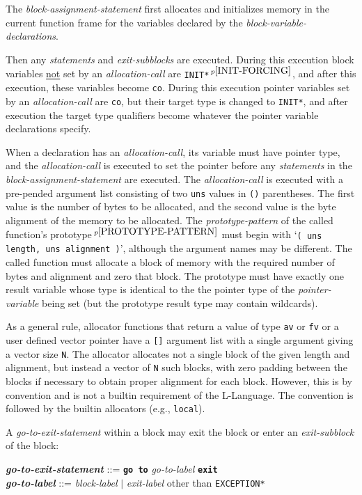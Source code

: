 \documentclass[12pt]{article}
\newcommand{\TT}[1]{{\tt \bfseries #1}}
\newcommand{\ttkey}[1]{{\tt \bfseries #1}}
\newcommand{\emkey}[1]{{\em \bfseries #1}}
\newcommand{\pagnote}[1]{$\,^{p\pageref{#1}}$}
\newenvironment{indpar}[1][0.3in]%
	{\begin{list}{}%
		     {\setlength{\itemsep}{0in}%
		      \setlength{\topsep}{0in}%
		      \setlength{\parsep}{1ex}%
		      \setlength{\labelwidth}{#1}%
		      \setlength{\leftmargin}{#1}%
		      \addtolength{\leftmargin}{\labelsep}}%
	 \item}%
	{\end{list}}
\begin{document}
The {\em block-assignment-statement}
first allocates and initializes memory in the current function frame
for the variables declared by the {\em block-variable-declarations}.

Then any {\em statements} and
{\em exit-subblocks} are executed.  During this execution
block variables \underline{not} set by an {\em allocation-call}
are {\tt *INIT*}\pagnote{INIT-FORCING},
and after this execution, these variables become
{\tt co}.  During this execution pointer variables set by
an {\em allocation-call} are {\tt co}, but their target type is changed
to {\tt *INIT*}, and after execution the target type
qualifiers become whatever the pointer variable declarations specify.

When a declaration has an {\em allocation-call}\label{ALLOCATION-CALLS},
its variable must have pointer
type, and the {\em allocation-call} is executed to set the pointer
before any {\em statements} in the {\em block-assignment-statement}
are executed.  The {\em allocation-call} is executed
with a pre-pended argument list consisting of two {\tt uns} values
in {\tt ()} parentheses.  The first value is the number of bytes to
be allocated, and the second value is the byte alignment of the
memory to be allocated.
The {\em prototype-pattern}
of the called function's prototype\pagnote{PROTOTYPE-PATTERN}
must begin with `{\tt ( uns length, uns alignment )}', although
the argument names may be different.
The called function must allocate a block of
memory with the required number of bytes and alignment and zero that
block.  The prototype must have
exactly one result variable whose type is identical to the
the pointer type of the {\em pointer-variable} being set (but the
prototype result type may contain wildcards).

As a general rule, allocator functions that return a value of
type {\tt av} or {\tt fv} or a user defined vector pointer
have a {\tt []} argument list
with a single argument giving a vector size {\tt N}.
The allocator allocates not a single block of the given length
and alignment, but instead a vector of {\tt N} such blocks, with zero padding
between the blocks if necessary to obtain proper alignment for each
block.  However,
this is by convention and is not a builtin requirement of the L-Language.
The convention is followed by the builtin allocators (e.g., {\tt local}).

A {\em go-to-exit-statement} within a block may exit the block or
enter an {\em exit-subblock} of the block:
\begin{indpar}
\emkey{go-to-exit-statement}\label{GO-TO-STATEMENT} ::=
    \ttkey{go to} {\em go-to-label} \TT{exit}
\\[0.5ex]
\emkey{go-to-label} ::= {\em block-label} $|$ {\em exit-label} other than
                        {\tt *EXCEPTION*}
\end{indpar}
\end{document}
